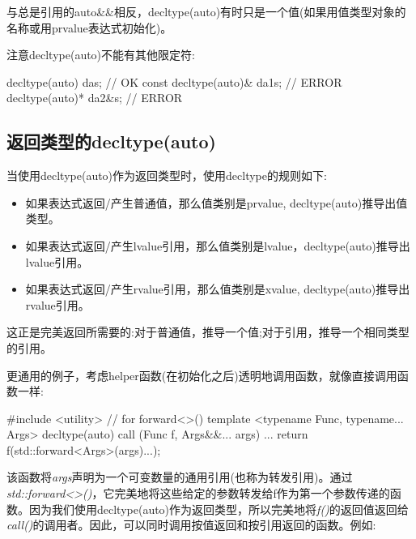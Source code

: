 与总是引用的auto\&\&相反，decltype(auto)有时只是一个值(如果用值类型对象的名称或用prvalue表达式初始化)。

注意decltype(auto)不能有其他限定符:

\begin{cppcode}
decltype(auto) da{s}; // OK
const decltype(auto)& da1{s}; // ERROR
decltype(auto)* da2{&s}; // ERROR
\end{cppcode}

\subsection{返回类型的decltype(auto)}

当使用decltype(auto)作为返回类型时，使用decltype的规则如下:

\begin{itemize}
	\item 如果表达式返回/产生普通值，那么值类别是prvalue, decltype(auto)推导出值类型。
	\item 如果表达式返回/产生lvalue引用，那么值类别是lvalue，decltype(auto)推导出lvalue引用。
	\item 如果表达式返回/产生rvalue引用，那么值类别是xvalue, decltype(auto)推导出rvalue引用。
\end{itemize}

这正是完美返回所需要的:对于普通值，推导一个值;对于引用，推导一个相同类型的引用。

更通用的例子，考虑helper函数(在初始化之后)透明地调用函数，就像直接调用函数一样:

\begin{cppcode}
#include <utility> // for forward<>()
template <typename Func, typename... Args>
decltype(auto) call (Func f, Args&&... args)
{
	...
	return f(std::forward<Args>(args)...);
}
\end{cppcode}

该函数将\textit{args}声明为一个可变数量的通用引用(也称为转发引用)。通过\textit{std::forward<>()}，它完美地将这些给定的参数转发给f作为第一个参数传递的函数。因为我们使用decltype(auto)作为返回类型，所以完美地将\textit{f()}的返回值返回给\textit{call()}的调用者。因此，可以同时调用按值返回和按引用返回的函数。例如:

